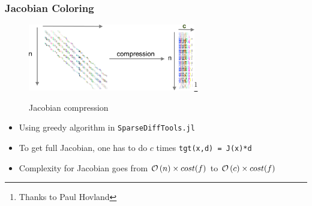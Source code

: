 \begin{frame}
  \frametitle{Jacobian Coloring}
  \begin{center}
    \begin{figure}
      \includegraphics[width=0.65\textwidth]{figures/compression}\footnote{Thanks to Paul Hovland}
      \caption{Jacobian compression}
    \end{figure}
  \end{center}
  \begin{itemize}
    \item Using greedy algorithm in \lstinline{SparseDiffTools.jl}
    \item To get full Jacobian, one has to do $c$ times \lstinline{tgt(x,d) = J(x)*d}
    \item Complexity for Jacobian goes from $\mathcal{O}\left( n \right) \times cost(f)$ to $\mathcal{O}\left( c \right) \times cost(f)$
  \end{itemize}
\end{frame}

